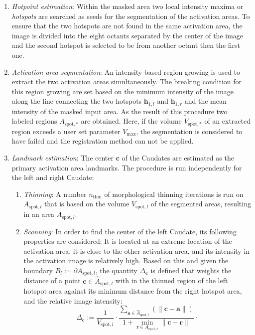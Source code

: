 \documentclass{frontiers}
\newcommand{\emitem}[1]{\item \emph{#1}}
\newcommand{\pc}{\ensuremath{\mathbf{c}}}
\newcommand{\pa}{\ensuremath{\mathbf{a}}}
\newcommand{\pr}{\ensuremath{\mathbf{r}}}
\newcommand{\hp}[1]{\ensuremath{\mathbf{h}_{#1}}}
\begin{document}
\begin{myalgorithm}
  \begin{enumerate}
  \emitem{Hotpoint estimation}: Within the masked area two local intensity maxima or \emph{hotspots}  are searched as seeds 
    for the segmentation of the activation areas. 
  To ensure that the two hotspots are not found in the same activation area, the image is divided into the 
    eight octants separated by the center of the image and the second hotspot is selected to be 
    from another octant then the first one. 
  \emitem{Activation area segmentation}: An intensity based region growing is used to extract the two activation 
     areas simultaneously. 
  The breaking condition for this region growing are set based on the minimum intensity of the image along the line 
    connecting the two hotspots  \hp{1,l} and \hp{1,r} and the mean intensity of the masked input area.
  As the result of this procedure two labeled regions $A_{\text{spot},*}$ are obtained. 
  Here, if the volume $V_{\text{spot},*}$ of an extracted region exceeds a user set parameter $V_{\text{max}}$, 
    the segmentation is considered to have failed and the registration method can not be applied.
  \emitem{Landmark estimation}: The center $\pc$ of the Caudates are estimated as the primary activation area landmarks.
    The procedure is run independently for the left and right Caudate:
  \begin{enumerate}
  \emitem{Thinning}: A number $n_{\text{thin}}$ of morphological thinning iterations \citep{lee_building_1994} is run on 
    $A_{\text{spot},l}$ that is based on the volume $V_{\text{spot},l}$ of the segmented areas, 
    resulting in an area $\hat{A}_{\text{spot},l}$. 
  \emitem{Scanning}: In order to find the center of the left Caudate, its following properties are considered: 
  It is located at an extreme location of the activation area, it is close to the other activation area, and 
    its intensity in the activation image is relatively high. 
  Based on this and given the boundary $B_l:= \partial A_{\text{spot},l}$, 
     the quantity $\Delta_{\pc}$ is defined that weights the distance of a point $\pc \in \hat{A}_{\text{spot},l}$ 
    with in the thinned region of the left hotspot area against its minimum distance from the right hotspot area, 
    and the relative image intensity: 
  \begin{equation}
    \Delta_{\pc} := \frac{1}{V_{\text{spot},l}} \cdot 
                   \frac{\sum_{\pa \in \hat{A}_{\text{spot},l}}(\|\pc-\pa\|) }{1 + \min_{\pr \in A_{\text{spot},r}}\|\pc-\pr\| } \cdot 

\end{equation}
\end{enumerate}
\end{enumerate}
\end{myalgorithm}
\end{document}

